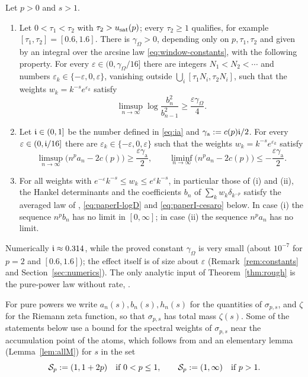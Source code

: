 \begin{theorem}\label{thm:rough}
Let $p>0$ and $s>1$.
\begin{enumerate}
\item[\textup{(i)}] Let $0<\tau_1<\tau_2$ with $\tau_2>u_{\mathrm{sat}}(p)$; every $\tau_2\ge1$ qualifies, for example
  $[\tau_1,\tau_2]=[0.6,1.6]$. There is $\gamma_\Omega>0$, depending only on $p,\tau_1,\tau_2$ and given by an integral
  over the arcsine law \eqref{eq:window-constants}, with the following property. For every
  $\varepsilon\in(0,\gamma_\Omega/16]$ there are integers $N_1<N_2<\cdots$ and numbers
  $\varepsilon_k\in\{-\varepsilon,0,\varepsilon\}$, vanishing outside $\bigcup_i[\tau_1N_i,\tau_2N_i]$, such that the
  weights $w_k=k^{-s}e^{\varepsilon_k}$ satisfy
  \[
    \limsup_{n\to\infty}\log\frac{b_n^2}{b_{n-1}^2}\ge\frac{\varepsilon\gamma_\Omega}{4}.
  \]
\item[\textup{(ii)}] Let $\mathfrak{i}\in(0,1]$ be the number defined in \eqref{eq:ia} and $\gamma_{\mathrm a}:=c(p)\mathfrak{i}/2$.
  For every $\varepsilon\in(0,\mathfrak{i}/16]$ there are $\varepsilon_k\in\{-\varepsilon,0,\varepsilon\}$ such that the weights
  $w_k=k^{-s}e^{\varepsilon_k}$ satisfy
  \[
    \limsup_{n\to\infty}\bigl(n^pa_n-2c(p)\bigr)\ge\frac{\varepsilon\gamma_{\mathrm a}}2,\qquad
    \liminf_{n\to\infty}\bigl(n^pa_n-2c(p)\bigr)\le-\frac{\varepsilon\gamma_{\mathrm a}}2.
  \]
\item[\textup{(iii)}] For all weights with $e^{-\varepsilon}k^{-s}\le w_k\le e^{\varepsilon}k^{-s}$, in particular those
  of \textup{(i)} and \textup{(ii)}, the Hankel determinants and the coefficients $b_n$ of $\sum_kw_k\delta_{k^{-p}}$
  satisfy the averaged law of \cite{PaperI}, \eqref{eq:paperI-logD} and \eqref{eq:paperI-cesaro} below. In case
  \textup{(i)} the sequence $n^pb_n$ has no limit in $[0,\infty]$; in case \textup{(ii)} the sequence $n^pa_n$ has no
  limit.
\end{enumerate}
\end{theorem}

Numerically $\mathfrak{i}\approx0.314$, while the proved constant $\gamma_\Omega$ is very small (about $10^{-7}$ for $p=2$ and
$[0.6,1.6]$); the effect itself is of size about $\varepsilon$ (Remark~\ref{rem:constants} and
Section~\ref{sec:numerics}). The only analytic input of Theorem~\ref{thm:rough} is the pure-power law without rate,
\cite[Corollary~1.3]{PaperII}.

For pure powers we write $a_n(s),b_n(s),h_n(s)$ for the quantities of $\sigma_{p,s}$, and $\zeta$ for the Riemann zeta
function, so that $\sigma_{p,s}$ has total mass $\zeta(s)$. Some of the statements below use a bound for the spectral
weights of $\sigma_{p,s}$ near the accumulation point of the atoms, which follows from \tailbound{} and an elementary
lemma (Lemma~\ref{lem:allM}) for $s$ in the set
\begin{equation}\label{eq:Sp}
  \mathcal{S}_p:=(1,1+2p)\quad\text{if }0<p\le1,\qquad \mathcal{S}_p:=(1,\infty)\quad\text{if }p>1.
\end{equation}

